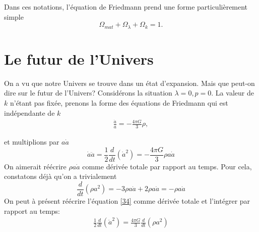 \documentclass[a4paper,12pt]{report}
\theoremstyle{plain}
\theoremstyle{plain}
\begin{document}
  Dans ces notations, l'\'equation de Friedmann prend une forme particuli\`erement simple 
  \begin{equation}
  \Omega_{mat} + \Omega_\lambda +\Omega_k =1.
  \end{equation} 
  \section{Le futur de l'Univers}
  On a vu que notre Univers se trouve dans un \'etat d'expansion. Mais que peut-on dire sur le futur de l'Univers? Consid\'erons la situation $ \lambda =0 , p=0$. La valeur de $k$ n'\'etant pas fix\'ee, prenons la forme des \'equations de Friedmann qui est ind\'ependante de $k$ 
  \begin{eqnarray} 
  \frac{\ddot{a}}{a} = - \frac{4 \pi G}{3} \rho ,
  \end{eqnarray}

  et multiplions par $a \dot{a} $ 
  \begin{equation}\label{34}
  \dot{a} \ddot{a} = \frac{1}{2} \frac{d}{dt} (\dot{a}^2) = - \frac{4\pi G}{3} \rho a \dot{a} 
  \end{equation}
 On aimerait r\'e\'ecrire $\rho a \dot{a}$ comme d\'eriv\'ee totale par rapport au temps. Pour cela, constatons d\'ej\`a qu'on a trivialement 
 \begin{equation}
 \frac{d}{dt} (\rho a^2)  = -3\rho a \dot{a} +2 \rho a \dot{a} =-\rho a\dot{a}
 \end{equation} 
 On peut \`a pr\'esent r\'e\'ecrire l'\'equation  \ref{34} comme d\'eriv\'ee totale et l'int\'egrer par rapport au temps:
 \begin{eqnarray}
 \frac{1}{2} \frac{d}{dt} (\dot{a}^2) = \frac{4\pi G}{3} \frac{d}{dt} (\rho a^2)
 \end{eqnarray}
  
\end{document}
